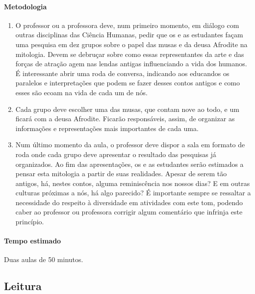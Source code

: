 \documentclass[12pt]{extarticle}
\begin{document}
\paragraph{Metodologia}

\begin{enumerate}

  \item
  O professor ou a professora deve, num primeiro momento, em diálogo com outras disciplinas 
  das Ciência Humanas, pedir que os e as estudantes façam
  uma pesquisa em dez grupos sobre o papel das musas e da deusa Afrodite na mitologia. 
  Devem se debruçar sobre como essas representantes da arte e das forças de atração agem nas lendas antigas 
  influenciando a vida dos humanos. É interessante abrir uma roda de conversa, 
  indicando aos educandos os paralelos e interpretações que podem se fazer desses 
  contos antigos e como esses são ecoam na vida de cada um de nós.

  \item
  Cada grupo deve escolher uma das musas, que contam nove ao todo, e um ficará com a deusa
  Afrodite. Ficarão responsáveis, assim, de organizar as informações e representações
  mais importantes de cada uma. 

  \item
  Num último momento da aula, o professor deve dispor a sala em formato de 
  roda onde cada grupo deve apresentar o resultado das pesquisas já 
  organizados. Ao fim das apresentações, os e as estudantes serão estimados
  a pensar esta mitologia a partir de suas realidades. Apesar de serem tão antigos,
  há, nestes contos, alguma reminiscência nos nossos dias? E em outras culturas
  próximas a nós, há algo parecido? É importante sempre se ressaltar
  a necessidade do respeito à diversidade em atividades com este tom, podendo
  caber ao professor ou professora corrigir algum comentário que infrinja
  este princípio.

\end{enumerate}

\paragraph{Tempo estimado} Duas aulas de 50 minutos.

 
\subsection{Leitura}
\end{document}
